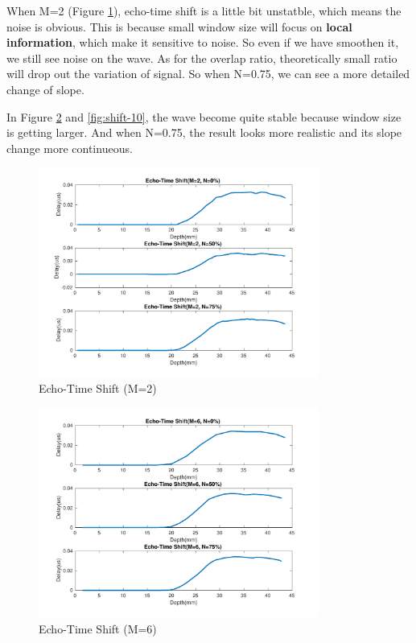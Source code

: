 \documentclass{article}
\begin{document}
When M=2 (Figure \ref{fig:shift-2}), echo-time shift is a little bit unstatble, which means the noise is obvious. This is because 
small window size will focus on \textbf{local information}, which make it sensitive to noise. So even if we have smoothen it, we 
still see noise on the wave. As for the overlap ratio, theoretically small ratio will drop out the variation of signal. So 
when N=0.75, we can see a more detailed change of slope.

In Figure \ref{fig:shift-6} and \ref{fig:shift-10}, the wave become quite stable because window size is getting larger. And 
when N=0.75, the result looks more realistic and its slope change more continueous.

\begin{figure}[H]
    \centering
    \includegraphics[width=0.82\textwidth]{src/shift_2.pdf}
    \caption{Echo-Time Shift (M=2)}
    \label{fig:shift-2}
\end{figure}
\begin{figure}[H]
    \centering
    \includegraphics[width=0.82\textwidth]{src/shift_6.pdf}
    \caption{Echo-Time Shift (M=6)}
    \label{fig:shift-6}
\end{figure}
\end{document}
